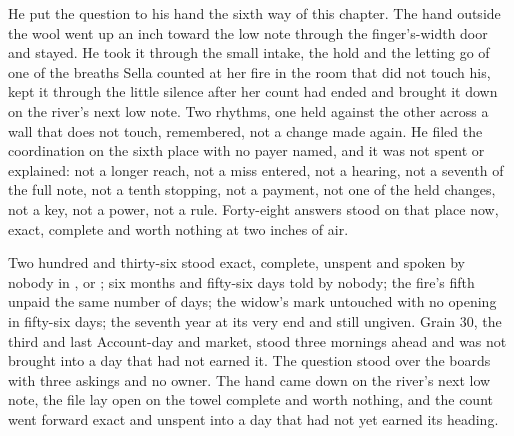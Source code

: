 He put the question to his hand the sixth way of this chapter. The hand outside the wool went up an inch toward the low note through the finger's-width door and stayed. He took it through the small intake, the hold and the letting go of one of the breaths Sella counted at her fire in the room that did not touch his, kept it through the little silence after her count had ended and brought it down on the river's next low note. Two rhythms, one held against the other across a wall that does not touch, remembered, not a change made again. He filed the coordination on the sixth place with no payer named, and it was not spent or explained: not a longer reach, not a miss entered, not a hearing, not a seventh of the full note, not a tenth stopping, not a payment, not one of the held changes, not a key, not a power, not a rule. Forty-eight answers stood on that place now, exact, complete and worth nothing at two inches of air.

Two hundred and thirty-six stood exact, complete, unspent and spoken by nobody in ,  or ; six months and fifty-six days told by nobody; the fire's fifth unpaid the same number of days; the widow's mark untouched with no opening in fifty-six days; the seventh year at its very end and still ungiven. Grain 30, the third and last Account-day and market, stood three mornings ahead and was not brought into a day that had not earned it. The question stood over the boards with three askings and no owner. The hand came down on the river's next low note, the file lay open on the towel complete and worth nothing, and the count went forward exact and unspent into a day that had not yet earned its heading.
